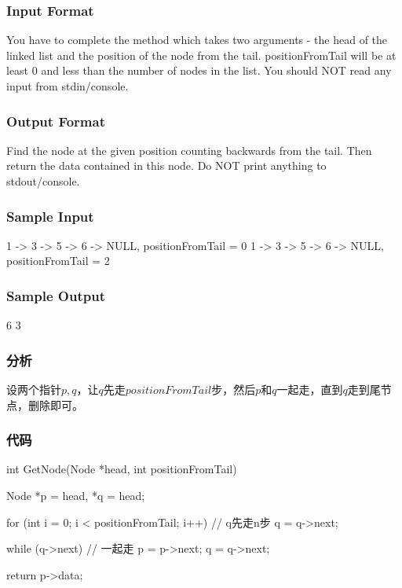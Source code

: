 \subsubsection{Input Format}
You have to complete the  method which takes two arguments - the head of the linked list and the position of the node from the tail. positionFromTail will be at least 0 and less than the number of nodes in the list. You should NOT read any input from stdin/console.


\subsubsection{Output Format}
Find the node at the given position counting backwards from the tail. Then return the data contained in this node. Do NOT print anything to stdout/console.


\subsubsection{Sample Input}
\begin{Code}
1 -> 3 -> 5 -> 6 -> NULL, positionFromTail = 0
1 -> 3 -> 5 -> 6 -> NULL, positionFromTail = 2
\end{Code}


\subsubsection{Sample Output}
\begin{Code}
6
3
\end{Code}


\subsubsection{分析}
设两个指针$p,q$，让$q$先走$positionFromTail$步，然后$p$和$q$一起走，直到$q$走到尾节点，删除即可。


\subsubsection{代码}
\begin{Code}
int GetNode(Node *head, int positionFromTail) {
    Node *p = head, *q = head;

    for (int i = 0; i < positionFromTail; i++)  // q先走n步
        q = q->next;

    while (q->next) { // 一起走
        p = p->next;
        q = q->next;
    }

    return p->data;
}
\end{Code}


